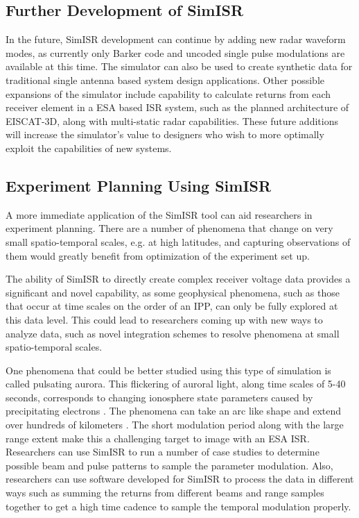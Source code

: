 \subsection{Further Development of SimISR}

In the future, SimISR development can continue by adding new radar waveform modes, as currently only Barker code and uncoded single pulse modulations are available at this time. The simulator can also be used to create synthetic data for traditional single antenna based system design applications. Other possible expansions of the simulator include capability to calculate returns from each receiver element in a ESA based ISR system, such as the planned architecture of EISCAT-3D, along with multi-static radar capabilities. These future additions will increase the simulator's value to designers who wish to more optimally exploit the capabilities of new systems. 

\subsection{Experiment Planning Using SimISR}

A more immediate application of the SimISR tool can aid researchers in experiment planning. There are a number of phenomena that change on very small spatio-temporal scales, e.g. at high latitudes, and capturing observations of them would greatly benefit from optimization of the experiment set up. 

The ability of SimISR to directly create complex receiver voltage data provides a significant and novel capability, as some geophysical phenomena, such as those that occur at time scales on the order of an IPP, can only be fully explored at this data level. This could lead to researchers coming up with new ways to analyze data, such as novel integration schemes to resolve phenomena at small spatio-temporal scales.

One phenomena that could be better studied using this type of simulation is called pulsating aurora. This flickering of auroral light, along time scales of 5-40 seconds, corresponds to changing ionosphere state parameters caused by precipitating electrons \citep{JGRA:JGRA21510}. The phenomena can take an arc like shape and extend over hundreds of kilometers \citep{JGRA:JGRA20202}. The short modulation period along with the large range extent make this a challenging target to image with an ESA ISR. Researchers can use SimISR to run a number of case studies to determine possible beam and pulse patterns to sample the parameter modulation. Also, researchers can use software developed for SimISR to process the data in different ways such as summing the returns from different beams and range samples together to get a high time cadence to sample the temporal modulation properly. 

